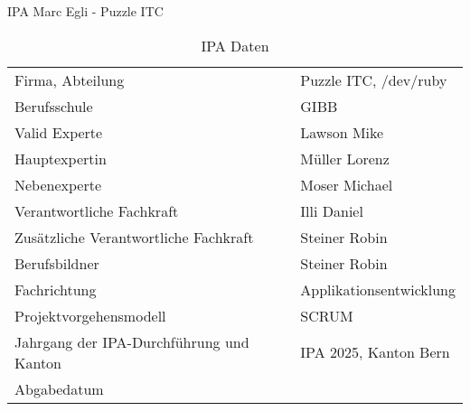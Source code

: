 \begin{titlepage}
  \Huge IPA Marc Egli - Puzzle ITC \normalsize
\bigbreak
\begin{table}[h!]
    \begin{tabular}{|L{0.4\textwidth}|L{0.5\textwidth}|}
        \hline
          \\[12pt]
        \hline
        Firma, Abteilung & Puzzle ITC, /dev/ruby \\
        \hline
        Berufsschule & GIBB \\
        \hline
        Valid Experte & Lawson Mike \\ 
        \hline
        Hauptexpertin & Müller Lorenz \\
        \hline
        Nebenexperte & Moser Michael \\
        \hline
        Verantwortliche Fachkraft & Illi Daniel \\
        \hline
        Zusätzliche Verantwortliche Fachkraft & Steiner Robin \\
        \hline
        Berufsbildner & Steiner Robin \\
        \hline
        Fachrichtung & Applikationsentwicklung \\
        \hline
        Projektvorgehensmodell & SCRUM \\
        \hline
        Jahrgang der IPA-Durchführung und Kanton &  IPA 2025, Kanton Bern \\
        \hline
        Abgabedatum & \\
        \hline
      \end{tabular}
      \caption{IPA Daten}
\end{table}
\end{titlepage}